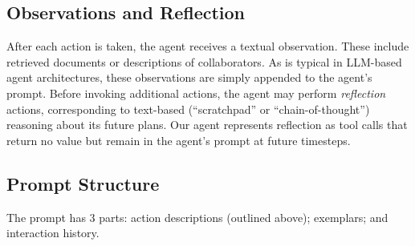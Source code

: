 \subsection{Observations and Reflection}

After each action is taken, the agent receives a textual observation.
These include retrieved documents or descriptions of collaborators. 
As is typical in LLM-based agent architectures, these observations are simply appended to the agent's prompt. Before invoking additional actions, the agent may perform \emph{reflection} actions, corresponding to text-based (``scratchpad'' or ``chain-of-thought'') reasoning about its future plans. Our agent represents reflection as tool calls that return no value but remain in the agent's prompt at future timesteps.





\subsection{Prompt Structure}

The prompt has 3 parts: action descriptions (outlined above); exemplars; and interaction history.

